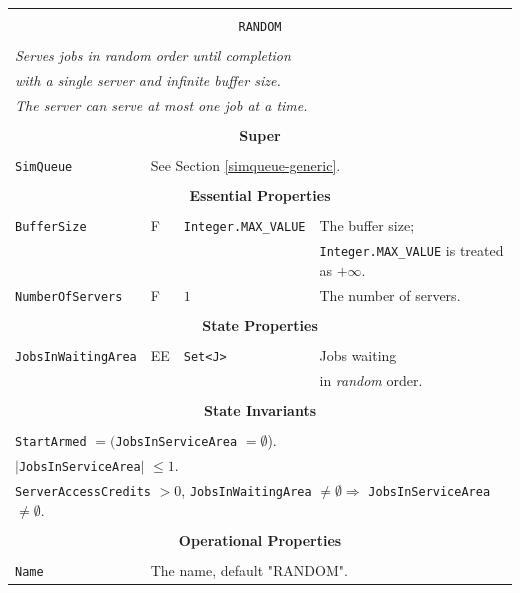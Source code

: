 \documentclass[12pt]{book}
\begin{document}
\begin{tabular}{|l|l|l|l|}
\hline
\multicolumn{4}{|c|}{} \\
\multicolumn{4}{|c|}{\lstinline[basicstyle=\large]{RANDOM}} \\
\multicolumn{4}{|c|}{} \\
\hline
\multicolumn{4}{|l|}{\em Serves jobs in random order until completion} \\
\multicolumn{4}{|l|}{\em with a single server and infinite buffer size.} \\
\multicolumn{4}{|l|}{\em The server can serve at most one job at a time.} \\
\hline
\multicolumn{4}{|c|}{} \\
\multicolumn{4}{|c|}{\bf Super} \\
\multicolumn{4}{|c|}{} \\
\hline
\lstinline|SimQueue| & \multicolumn{3}{|l|}{See Section \ref{simqueue-generic}.} \\
\hline
\multicolumn{4}{|c|}{} \\
\multicolumn{4}{|c|}{\bf Essential Properties} \\
\multicolumn{4}{|c|}{} \\
\hline
\lstinline|BufferSize|      & F & \lstinline|Integer.MAX_VALUE|
                            & The buffer size; \\
                        & & & \lstinline|Integer.MAX_VALUE| is treated as $+\infty$. \\
\hline
\lstinline|NumberOfServers| & F & $1$
                            & The number of servers. \\
\hline
\multicolumn{4}{|c|}{} \\
\multicolumn{4}{|c|}{\bf State  Properties} \\
\multicolumn{4}{|c|}{} \\
\hline
\lstinline|JobsInWaitingArea| & EE & \lstinline|Set<J>| & Jobs waiting \\
                              &    &                    & in {\em random\/} order. \\
\hline
\multicolumn{4}{|c|}{} \\
\multicolumn{4}{|c|}{\bf State  Invariants} \\
\multicolumn{4}{|c|}{} \\
\hline
\multicolumn{4}{|l|}{\lstinline|StartArmed| $= ($\lstinline|JobsInServiceArea| $= \emptyset$).} \\
\multicolumn{4}{|l|}{$|$\lstinline|JobsInServiceArea|$|$ $\leq 1$.} \\
\multicolumn{4}{|l|}{\lstinline|ServerAccessCredits| $> 0$, \lstinline|JobsInWaitingArea| $\neq \emptyset
                     \Rightarrow$ \lstinline|JobsInServiceArea| $\neq \emptyset$.} \\
\hline
\multicolumn{4}{|c|}{} \\
\multicolumn{4}{|c|}{\bf Operational Properties} \\
\multicolumn{4}{|c|}{} \\
\hline
\lstinline|Name| & \multicolumn{3}{|l|}{The name, default "RANDOM".} \\
\hline
\end{tabular}
\end{document}
